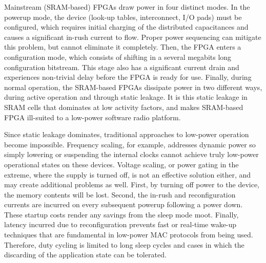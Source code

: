 Mainstream (SRAM-based) FPGAs draw power in four distinct modes. 
In the powerup mode, the device (look-up tables, 
interconnect, I/O pads) must be configured, which requires initial 
charging of the distributed capacitances and causes a significant 
in-rush current to flow. Proper power sequencing can mitigate this 
problem, but cannot eliminate it completely. Then, the FPGA enters 
a configuration mode, which consists of shifting in a several megabits
long configuration bitstream. This stage also has a significant current 
drain and experiences non-trivial delay before the FPGA is ready for use. 
Finally, during normal operation, the SRAM-based FPGAs dissipate power in 
two different ways, during active operation and through static leakage. 
It is this static leakage in SRAM cells that dominates at low activity factors, and 
makes SRAM-based FPGA ill-suited to a low-power software radio platform.

Since static leakage dominates, traditional approaches to low-power 
operation become impossible. Frequency scaling, for example, addresses 
dynamic power so simply lowering or suspending the internal clocks 
cannot achieve truly low-power operational states on these devices. 
Voltage scaling, or power gating in the extreme, where the supply is
turned off, is not an effective solution either, and may create additional 
problems as well. First, by turning off power to the device, the memory 
contents will be lost. Second, the in-rush and reconfiguration currents 
are incurred on every subsequent powerup following a power down. 
These startup costs render any savings from the sleep mode
moot. Finally, latency incurred due to reconfiguration prevents fast or 
real-time wake-up techniques that are fundamental in low-power MAC protocols 
from being used. Therefore, duty cycling is limited to long sleep cycles and 
cases in which the discarding of the application state can be tolerated.

\begin{comment}
The design of \sdr addresses the power requirement by choosing an
flash-based FPGA and highly integrated components, thus reducing size,
cost, and power.  In particular, flash-based FPGAs can be duty-cycled,
whereas traditional SRAM-based ones cannot.  \sdr also relaxes some of
the flexibility that other SDR platforms provide, and integrates the
RF frontend, baseband processing, and application processor all on one
PCB board. Therefore, the RF frontend is fixed for a single radio
band. The advantage of this approach is the smaller component count as
no PCB interconnects are necessary. In addition, the physical size
reduces significantly, as no space has to be allocated for potential
future expansion boards or a modular interconnect. The higher
integration also reduces the manufacturing cost, resulting in a final
cost that is less than \$150.
\end{comment}


